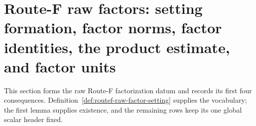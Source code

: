 \section{Route-F raw factors: setting formation, factor norms, factor identities, the product estimate, and factor units}\label{sec:routef-raw-factors}

This section forms the raw Route-F factorization datum and records its first four consequences.
Definition~\ref{def:routef-raw-factor-setting} supplies the vocabulary; the first lemma
supplies existence, and the remaining rows keep its one global scalar header fixed.

